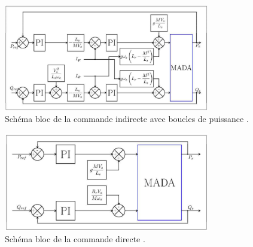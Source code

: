 \begin{figure}[!h]
    \centering
    \includegraphics[width=0.8\textwidth]{diagrammes/arc2.png} 
    \caption{Schéma bloc de la commande indirecte avec boucles de puissance \cite{Boyette2006}.}
    \label{img-arc2}
\end{figure}

\begin{figure}[!h]
    \centering
    \includegraphics[width=0.8\textwidth]{diagrammes/arc3.png} 
    \caption{Schéma bloc de la commande directe \cite{Boyette2006}.}
    \label{img-arc3}
\end{figure}
